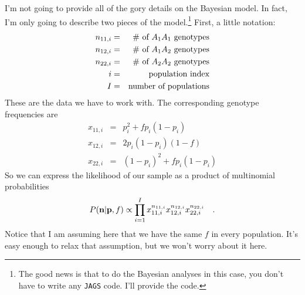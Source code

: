 \documentclass[12pt]{article}
\begin{document}
I'm not going to provide all of the gory details on the Bayesian
model. In fact, I'm only going to describe two pieces of the
model.\footnote{The good news is that to do the Bayesian analyses in
  this case, you don't have to write any {\tt JAGS} code. I'll provide
  the code.} First, a little notation:
\begin{eqnarray*}
n_{11,i} &=& \hbox{\# of $A_1A_1$ genotypes} \\
n_{12,i} &=& \hbox{\# of $A_1A_2$ genotypes} \\
n_{22,i} &=& \hbox{\# of $A_2A_2$ genotypes} \\
i         &=& \hbox{population index} \\
I         &=& \hbox{number of populations} \\
\end{eqnarray*}
These are the data we have to work with. The corresponding genotype
frequencies are
\begin{eqnarray*}
x_{11,i} &=& p_{i}^2 + fp_{i}(1-p_{i}) \\
x_{12,i} &=& 2p_{i}(1-p_{i})(1-f) \\
x_{22,i} &=& (1-p_{i})^2 + fp_{i}(1-p_{i})
\end{eqnarray*}
So we can express the likelihood of our sample as a product of
multinomial probabilities
\[
P({\bf n}|{\bf p},f) \propto \prod_{i=1}^I x_{11,i}^{n_{11,i}}
x_{12,i}^{n_{12,i}} x_{22,i}^{n_{22,i}} \quad .
\]
Notice that I am assuming here that we have the same $f$ in every
population. It's easy enough to relax that assumption, but we won't
worry about it here.
\end{document}
